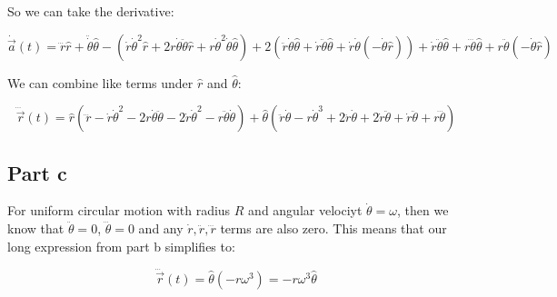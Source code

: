\documentclass{article}
\theoremstyle{definition}
\numberwithin{equation}{section}
\numberwithin{definition}{section}
\begin{document}
So we can take the derivative:

\[ \dot {\vec a}(t) = \dddot r \hat r + \ddot \dot \theta \hat \theta - (\dot r \dot \theta ^2 \hat r + 2r \dot \theta \ddot \theta \hat r + r \dot \theta^2 \dot \theta \hat \theta) + 2(\ddot r \dot \theta \hat \theta + \dot r \ddot \theta \hat \theta + \dot r \dot \theta (-\dot \theta \hat r)) + \dot r \ddot \theta \hat \theta + r \dddot \theta \hat \theta + r \ddot \theta (-\dot \theta \hat r)\]

We can combine like terms under $\hat r$ and $\hat \theta$:

\[ \dddot {\vec r}(t) = \hat r (\dddot r - \dot r \dot \theta^2 - 2r \dot \theta \ddot \theta - 2 \dot r \dot \theta^2 - r\ddot \theta \dot \theta) + \hat \theta(\ddot r \dot \theta - r\dot \theta ^3 + 2 \ddot r \dot \theta + 2 \dot r \ddot \theta + \dot r \ddot \theta + r \dddot \theta)\]

\subsection{Part c} 

For uniform circular motion with radius $R$ and angular velociyt $\dot \theta = \omega$, then we know that $\ddot \theta = 0$, $\dddot \theta = 0$ and any $\dot r, \ddot r, \dddot r$ terms are also zero. This means that our long expression from part b simplifies to:

\[ \dddot{\vec r}(t) = \hat \theta (-r\omega^3) = \boxed{-r\omega^3\hat \theta }\]


	
\end{document}
